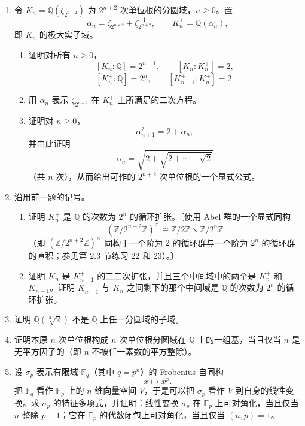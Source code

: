 \begin{enumerate}[label=\arabic*.]
\item 令 $K_n=\mathbb Q(\zeta_{2^{n+2}})$ 为 $2^{n+2}$ 次单位根的分圆域，$n\geq 0$。置
\[
\alpha_n=\zeta_{2^{n+2}}+\zeta_{2^{n+2}}^{-1},
\qquad
K_n^+=\mathbb Q(\alpha_n),
\]
即 $K_n$ 的极大实子域。
\begin{enumerate}[label=(\alph*)]
\item 证明对所有 $n\geq 0$，
\[
[K_n:\mathbb Q]=2^{n+1},\qquad [K_n:K_n^+]=2,
\]
\[
[K_n^+:\mathbb Q]=2^n,
\qquad [K_{n+1}^+:K_n^+]=2.
\]

\item 用 $\alpha_n$ 表示 $\zeta_{2^{n+2}}$ 在 $K_n^+$ 上所满足的二次方程。

\item 证明对 $n\geq 0$，
\[
\alpha_{n+1}^2=2+\alpha_n,
\]
并由此证明
\[
\alpha_n=\sqrt{2+\sqrt{2+\cdots+\sqrt2}}
\]
（共 $n$ 次），从而给出可作的 $2^{n+2}$ 次单位根的一个显式公式。
\end{enumerate}

\item 沿用前一题的记号。
\begin{enumerate}[label=(\alph*)]
\item 证明 $K_n^+$ 是 $\mathbb Q$ 的次数为 $2^n$ 的循环扩张。〔使用 Abel 群的一个显式同构
\[
(\mathbb Z/2^{n+2}\mathbb Z)^\times\cong \mathbb Z/2\mathbb Z\times\mathbb Z/2^n\mathbb Z
\]
（即 $(\mathbb Z/2^{n+2}\mathbb Z)^\times$ 同构于一个阶为 $2$ 的循环群与一个阶为 $2^n$ 的循环群的直积；参见第 2.3 节练习 22 和 23）。〕

\item 证明 $K_n$ 是 $K_{n-1}^+$ 的二二次扩张，并且三个中间域中的两个是 $K_n^+$ 和 $K_{n-1}$。证明 $K_{n-1}^+$ 与 $K_n$ 之间剩下的那个中间域是 $\mathbb Q$ 的次数为 $2^n$ 的循环扩张。
\end{enumerate}

\item 证明 $\mathbb Q(\sqrt[3]{2})$ 不是 $\mathbb Q$ 上任一分圆域的子域。

\item 证明本原 $n$ 次单位根构成 $n$ 次单位根分圆域在 $\mathbb Q$ 上的一组基，当且仅当 $n$ 是无平方因子的（即 $n$ 不被任一素数的平方整除）。

\item 设 $\sigma_p$ 表示有限域 $\mathbb F_q$（其中 $q=p^n$）的 Frobenius 自同构
\[
x\longmapsto x^p.
\]
把 $\mathbb F_q$ 看作 $\mathbb F_p$ 上的 $n$ 维向量空间 $V$，于是可以把 $\sigma_p$ 看作 $V$ 到自身的线性变换。求 $\sigma_p$ 的特征多项式，并证明：线性变换 $\sigma_p$ 在 $\mathbb F_p$ 上可对角化，当且仅当 $n$ 整除 $p-1$；它在 $\mathbb F_p$ 的代数闭包上可对角化，当且仅当 $(n,p)=1$。


\end{enumerate}
